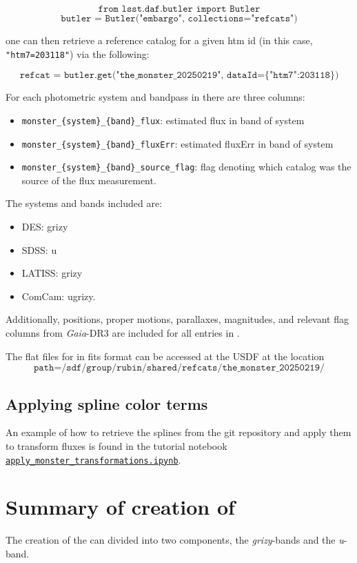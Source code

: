 $$\texttt{from lsst.daf.butler import Butler}$$
$$\texttt{butler = Butler("embargo", collections="refcats")}$$

one can then retrieve a reference catalog for a given htm id (in this case, \texttt{"htm7=203118"}) via the following:

$$\texttt{refcat = butler.get("the\_monster\_20250219", dataId=\{"htm7":203118\})}$$

For each photometric system and bandpass in \monster there are three columns:
\begin{itemize}
    \item \texttt{monster\_\{system\}\_\{band\}\_flux}: estimated flux in band of system
    \item \texttt{monster\_\{system\}\_\{band\}\_fluxErr}: estimated fluxErr in band of system
    \item \texttt{monster\_\{system\}\_\{band\}\_source\_flag}: flag denoting which catalog was the source of the flux measurement.
\end{itemize}

The systems and bands included are:
\begin{itemize}
    \item DES: grizy
    \item SDSS: u
    \item LATISS: grizy
    \item ComCam: ugrizy.
\end{itemize}

Additionally, positions, proper motions, parallaxes, magnitudes, and relevant flag columns from \emph{Gaia}-DR3 are included for all entries in \monster.

The flat files for \monster in fits format can be accessed at the USDF at the location
$$\texttt{path=/sdf/group/rubin/shared/refcats/the\_monster\_20250219/}$$

\subsection{Applying spline color terms}

An example of how to retrieve the splines from the git repository and apply them to transform fluxes is found in the tutorial notebook \href{https://github.com/lsst-dm/dmtn-277/blob/main/notebooks/apply_monster_transformations.ipynb}{\texttt{apply\_monster\_transformations.ipynb}}.

\section{Summary of creation of \monster}
\label{sec:summary}
The creation of the \monster can divided into two components, the \textit{grizy}-bands and the \textit{u}-band.


